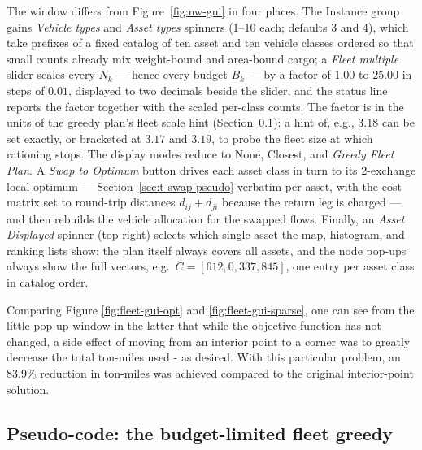 The window differs from Figure~\ref{fig:nw-gui} in four places. The
Instance group gains \emph{Vehicle types} and \emph{Asset types} spinners
(1--10 each; defaults 3 and 4), which take prefixes of a fixed catalog of
ten asset and ten vehicle classes ordered so that small counts already
mix weight-bound and area-bound cargo; a \emph{Fleet multiple} slider
scales every $N_k$ --- hence every budget $B_k$ --- by a factor of
$1.00$ to $25.00$ in steps of $0.01$, displayed to two decimals beside
the slider, and the status line reports the factor together with the
scaled per-class counts. The factor is in the units of the greedy plan's
fleet scale hint (Section~\ref{sec:t-fleetgreedy-pseudo}): a hint of,
e.g., $3.18$ can be set exactly, or bracketed at $3.17$ and $3.19$, to
probe the fleet size at which rationing stops. The display modes reduce to None,
Closest, and \emph{Greedy Fleet Plan}. A \emph{Swap to Optimum} button
drives each asset class in turn to its 2-exchange local optimum ---
Section~\ref{sec:t-swap-pseudo} verbatim per asset, with the cost matrix
set to round-trip distances $d_{ij} + d_{ji}$ because the return leg is
charged --- and then rebuilds the vehicle allocation for the swapped
flows. Finally, an \emph{Asset Displayed} spinner (top right) selects
which single asset the map, histogram, and ranking lists show; the plan
itself always covers all assets, and the node pop-ups always show the
full vectors, e.g.\ $C = [612, 0, 337, 845]$, one entry per asset class
in catalog order.

Comparing Figure \ref{fig:fleet-gui-opt} and \ref{fig:fleet-gui-sparse}, one can
see from the little pop-up window in the latter that while the objective function
has not changed, a side effect of moving from an interior point to
a corner was to greatly decrease the total ton-miles used  -  as desired.
With this particular problem, an 83.9\% reduction in ton-miles was achieved
compared to the original interior-point solution.

\subsection{Pseudo-code: the budget-limited fleet greedy}
\label{sec:t-fleetgreedy-pseudo}

